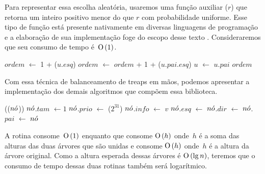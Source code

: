 Para representar essa escolha aleatória, usaremos uma função auxiliar \random($r$) que retorna um inteiro positivo menor do que $r$ com probabilidade uniforme. Esse tipo de função está presente nativamente em diversas linguagens de programação \TODO{(}e a elaboração de sua implementação foge do escopo desse texto . Consideraremos que seu consumo de tempo é~$\text{O}\left(1\right)$.

\begin{algorithm}
\caption{\treapOrder($u$)}
\label{Algo:TREAPorder}
\begin{algorithmic}[1]
\State $ordem$ $\gets$ 1 + \treapGetSize($u$.$esq$)
  \State $ordem$ $\gets$ $ordem$ + 1 + \treapGetSize($u$.$pai$.$esq$)
\EndIf
  \State $u$ $\gets$ $u$.$pai$
\EndWhile
\State \Return $ordem$
\end{algorithmic}
\end{algorithm}

Com essa técnica de balanceamento de treaps em mãos, podemos apresentar a implementação dos demais algoritmos que compõem essa biblioteca.

\begin{algorithm}
\caption{\treapCreate($v$)}
\label{Algo:TREAPbuild}
\begin{algorithmic}[1]
\State \malloc(\sizeof($n\acute{o}$))
\State $n\acute{o}$.$tam$ $\gets 1$
\State $n\acute{o}$.$prio$ $\gets$ \random($2^{31}$)
\State $n\acute{o}$.$info$ $\gets$ $v$
\State $n\acute{o}$.$esq$ $\gets$ $n\acute{o}$.$dir$ $\gets$ $n\acute{o}$.$pai$ $\gets$ \Nil
\State \Return $n\acute{o}$
\end{algorithmic}
\end{algorithm}

\newpage
A rotina \treapCreate{} consome~$\text{O}\left(1\right)$ enquanto que \treapJoin{} consome $\text{O}\left(h\right)$ onde~$h$ é a soma das alturas das duas árvores que são unidas e \treapSplit{} consome $\text{O}\left(h\right)$ onde~$h$ é a altura da árvore original. Como a altura esperada dessas árvores é  $\text{O}\left(\lg n\right)$, teremos que o consumo de tempo dessas duas rotinas também será logarítmico.

